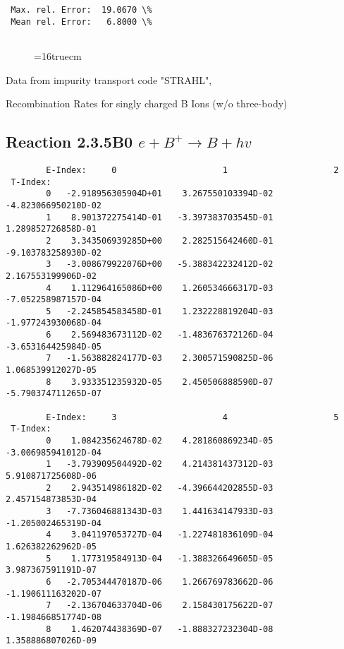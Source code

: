 \documentclass[12pt,dvipdfmx]{article}
\begin{document}
\begin{small}
\begin{verbatim}
 Max. rel. Error:  19.0670 \%
 Mean rel. Error:   6.8000 \%


\end{verbatim}\end{small}
\begin{figure} \label{2.3.4B1}
\epsfxsize=16truecm
\end{figure}
\newpage
Data from impurity transport code "STRAHL", \cite{kn:Behringer}

  Recombination Rates for singly charged B Ions (w/o three-body)
\subsection{
Reaction 2.3.5B0 $ e + B^+ \rightarrow B + hv $
}


\begin{small}\begin{verbatim}
        E-Index:     0                     1                     2
 T-Index:
        0   -2.918956305904D+01    3.267550103394D-02   -4.823066950210D-02
        1    8.901372275414D-01   -3.397383703545D-01    1.289852726858D-01
        2    3.343506939285D+00    2.282515642460D-01   -9.103783258930D-02
        3   -3.008679922076D+00   -5.388342232412D-02    2.167553199906D-02
        4    1.112964165086D+00    1.260534666317D-03   -7.052258987157D-04
        5   -2.245854583458D-01    1.232228819204D-03   -1.977243930068D-04
        6    2.569483673112D-02   -1.483676372126D-04   -3.653164425984D-05
        7   -1.563882824177D-03    2.300571590825D-06    1.068539912027D-05
        8    3.933351235932D-05    2.450506888590D-07   -5.790374711265D-07

        E-Index:     3                     4                     5
 T-Index:
        0    1.084235624678D-02    4.281860869234D-05   -3.006985941012D-04
        1   -3.793909504492D-02    4.214381437312D-03    5.910871725608D-06
        2    2.943514986182D-02   -4.396644202855D-03    2.457154873853D-04
        3   -7.736046881343D-03    1.441634147933D-03   -1.205002465319D-04
        4    3.041197053727D-04   -1.227481836109D-04    1.626382262962D-05
        5    1.177319584913D-04   -1.388326649605D-05    3.987367591191D-07
        6   -2.705344470187D-06    1.266769783662D-06   -1.190611163202D-07
        7   -2.136704633704D-06    2.158430175622D-07   -1.198466851774D-08
        8    1.462074438369D-07   -1.888327232304D-08    1.358886807026D-09


\end{verbatim}
\end{small}
\end{document}
